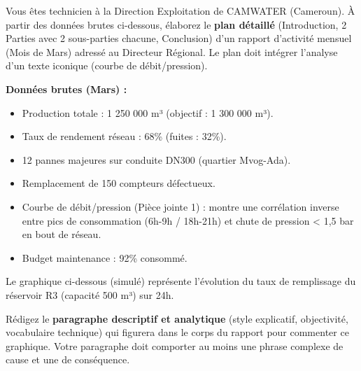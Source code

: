 \documentclass[11pt]{article}
\begin{document}
\begin{exercice}
Vous êtes technicien à la Direction Exploitation de CAMWATER (Cameroun). À partir des données brutes ci-dessous, élaborez le \textbf{plan détaillé} (Introduction, 2 Parties avec 2 sous-parties chacune, Conclusion) d'un rapport d'activité mensuel (Mois de Mars) adressé au Directeur Régional. Le plan doit intégrer l'analyse d'un texte iconique (courbe de débit/pression).

\textbf{Données brutes (Mars) :}
\begin{itemize}
    \item Production totale : 1 250 000 m³ (objectif : 1 300 000 m³).
    \item Taux de rendement réseau : 68\% (fuites : 32\%).
    \item 12 pannes majeures sur conduite DN300 (quartier Mvog-Ada).
    \item Remplacement de 150 compteurs défectueux.
    \item Courbe de débit/pression (Pièce jointe 1) : montre une corrélation inverse entre pics de consommation (6h-9h / 18h-21h) et chute de pression < 1,5 bar en bout de réseau.
    \item Budget maintenance : 92\% consommé.
\end{itemize}
\end{exercice}

\begin{exercice}
Le graphique ci-dessous (simulé) représente l'évolution du taux de remplissage du réservoir R3 (capacité 500 m³) sur 24h.

\begin{center}
\end{center}

Rédigez le \textbf{paragraphe descriptif et analytique} (style explicatif, objectivité, vocabulaire technique) qui figurera dans le corps du rapport pour commenter ce graphique. Votre paragraphe doit comporter au moins une phrase complexe de cause et une de conséquence.
\end{exercice}
\end{document}
